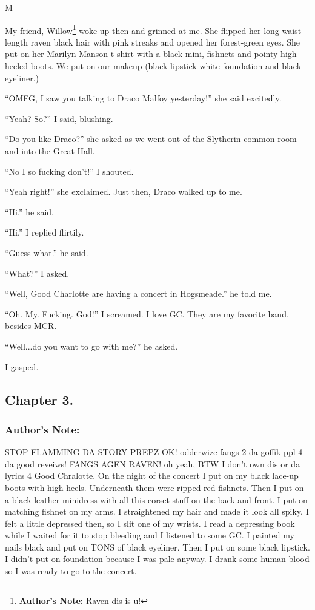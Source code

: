M\documentclass{article}
\begin{document}
My friend, Willow\footnote{\textbf{Author's Note: }Raven dis is u!} woke up then and grinned at me. She flipped her long waist-length raven black hair with pink streaks and opened her forest-green eyes. She put on her Marilyn Manson t-shirt with a black mini, fishnets and pointy high-heeled boots. We put on our makeup (black lipstick white foundation and black eyeliner.)

“OMFG, I saw you talking to Draco Malfoy yesterday!” she said excitedly.

“Yeah? So?” I said, blushing.

“Do you like Draco?” she asked as we went out of the Slytherin common room and into the Great Hall.

“No I so fucking don’t!” I shouted.

“Yeah right!” she exclaimed. Just then, Draco walked up to me.

“Hi.” he said.

“Hi.” I replied flirtily.

“Guess what.” he said.

“What?” I asked.

“Well, Good Charlotte are having a concert in Hogsmeade.” he told me.

“Oh. My. Fucking. God!” I screamed. I love GC. They are my favorite band, besides MCR.

“Well...do you want to go with me?” he asked.

I gasped.

\clearpage
\nolinenumbers
\subsection*{Chapter 3.}

\subsubsection*{Author's Note:} STOP FLAMMING DA STORY PREPZ OK! odderwize fangs 2 da goffik ppl 4 da good reveiws! FANGS AGEN RAVEN! oh yeah, BTW I don’t own dis or da lyrics 4 Good Chralotte.
\textbreak
\linenumbers\resetlinenumber
On the night of the concert I put on my black lace-up boots with high heels. Underneath them were ripped red fishnets. Then I put on a black leather minidress with all this corset stuff on the back and front. I put on matching fishnet on my arms. I straightened my hair and made it look all spiky. I felt a little depressed then, so I slit one of my wrists. I read a depressing book while I waited for it to stop bleeding and I listened to some GC. I painted my nails black and put on TONS of black eyeliner. Then I put on some black lipstick. I didn’t put on foundation because I was pale anyway. I drank some human blood so I was ready to go to the concert.
\end{document}
